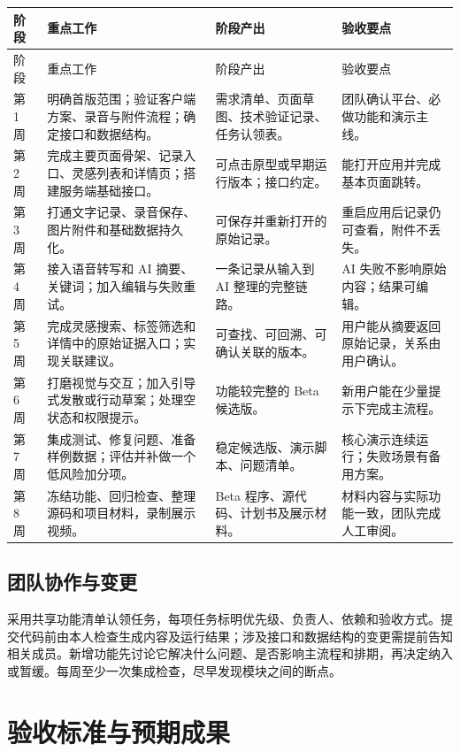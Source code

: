 \documentclass[UTF8,a4paper,12pt]{ctexart}
\begin{document}
\begin{longtable}{p{1.9cm} p{3.5cm} p{5.3cm} p{3.0cm}}
\toprule
阶段 & 重点工作 & 阶段产出 & 验收要点\\
\midrule
\endfirsthead
\toprule
阶段 & 重点工作 & 阶段产出 & 验收要点\\
\midrule
\endhead
\bottomrule
\endfoot
第 1 周 & 明确首版范围；验证客户端方案、录音与附件流程；确定接口和数据结构。 & 需求清单、页面草图、技术验证记录、任务认领表。 & 团队确认平台、必做功能和演示主线。\\
第 2 周 & 完成主要页面骨架、记录入口、灵感列表和详情页；搭建服务端基础接口。 & 可点击原型或早期运行版本；接口约定。 & 能打开应用并完成基本页面跳转。\\
第 3 周 & 打通文字记录、录音保存、图片附件和基础数据持久化。 & 可保存并重新打开的原始记录。 & 重启应用后记录仍可查看，附件不丢失。\\
第 4 周 & 接入语音转写和 AI 摘要、关键词；加入编辑与失败重试。 & 一条记录从输入到 AI 整理的完整链路。 & AI 失败不影响原始内容；结果可编辑。\\
第 5 周 & 完成灵感搜索、标签筛选和详情中的原始证据入口；实现关联建议。 & 可查找、可回溯、可确认关联的版本。 & 用户能从摘要返回原始记录，关系由用户确认。\\
第 6 周 & 打磨视觉与交互；加入引导式发散或行动草案；处理空状态和权限提示。 & 功能较完整的 Beta 候选版。 & 新用户能在少量提示下完成主流程。\\
第 7 周 & 集成测试、修复问题、准备样例数据；评估并补做一个低风险加分项。 & 稳定候选版、演示脚本、问题清单。 & 核心演示连续运行；失败场景有备用方案。\\
第 8 周 & 冻结功能、回归检查、整理源码和项目材料，录制展示视频。 & Beta 程序、源代码、计划书及展示材料。 & 材料内容与实际功能一致，团队完成人工审阅。\\
\bottomrule
\end{longtable}

\subsection{团队协作与变更}
采用共享功能清单认领任务，每项任务标明优先级、负责人、依赖和验收方式。提交代码前由本人检查生成内容及运行结果；涉及接口和数据结构的变更需提前告知相关成员。新增功能先讨论它解决什么问题、是否影响主流程和排期，再决定纳入或暂缓。每周至少一次集成检查，尽早发现模块之间的断点。

\section{验收标准与预期成果}
\end{document}
